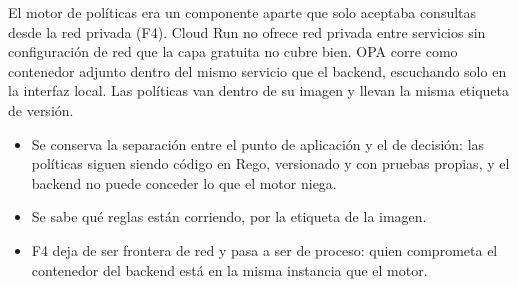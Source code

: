 \documentclass[11pt,a4paper]{article}
\theoremstyle{definition}
\theoremstyle{remark}
\begin{document}
\adrctx El motor de políticas era un componente aparte que solo aceptaba
consultas desde la red privada (F4). Cloud Run no ofrece red privada entre
servicios sin configuración de red que la capa gratuita no cubre bien.
\adrdec OPA corre como contenedor adjunto dentro del mismo servicio que el
backend, escuchando solo en la interfaz local. Las políticas van dentro de su
imagen y llevan la misma etiqueta de versión.
\adrpos
\begin{itemize}
  \item Se conserva la separación entre el punto de aplicación y el de
    decisión: las políticas siguen siendo código en Rego, versionado y con
    pruebas propias, y el backend no puede conceder lo que el motor niega.
  \item Se sabe qué reglas están corriendo, por la etiqueta de la imagen.
\end{itemize}
\adrneg
\begin{itemize}
  \item F4 deja de ser frontera de red y pasa a ser de proceso: quien
    comprometa el contenedor del backend está en la misma instancia que el
    motor.
\end{itemize}
\end{document}
